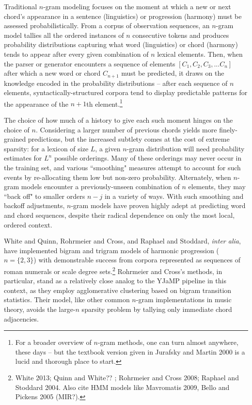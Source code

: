 \begin{enumerate}
Traditional $n$-gram modeling focuses on the moment at which a new or next chord's appearance in a sentence (linguistics) or progression (harmony) must be assessed probabilistically.  From a corpus of observation sequences, an $n$-gram model tallies all the ordered instances of $n$ consecutive tokens and produces probability distributions capturing what word (linguistics) or chord (harmony) tends to appear after every given combination of $n$ lexical elements.  Then, when the parser or generator encounters a sequence of elements $[C_1,C_2,C_3,...C_n]$ after which a new word or chord $C_{n+1}$ must be predicted, it draws on the knowledge encoded in the probability distributions -- after each sequence of $n$ elements, syntactically-structured corpora tend to display predictable patterns for the appearance of the $n+1$th element.\footnote{For a broader overview of $n$-gram methods, one can turn almost anywhere, these days -- but the textbook version given in Jurafsky and Martin 2000 is a lucid and thorough place to start.}

The choice of how much of a history to give each such moment hinges on the choice of $n$.  Considering a larger number of previous chords yields more finely-grained predictions, but the increased subtlety comes at the cost of extreme sparsity: for a lexicon of size $L$, a given $n$-gram distribution will need probability estimates for $L^n$ possible orderings.  Many of these orderings may never occur in the training set, and various ``smoothing" measures attempt to account for such events by re-allocating them low but non-zero probability.  Alternately, when $n$-gram models encounter a previously-unseen combination of $n$ elements, they may ``back off" to smaller orders $n-j$ in a variety of ways.  With such smoothing and backoff adjustments, $n$-gram models have proven highly adept at predicting word and chord sequences, despite their radical dependence on only the most local, ordered context.

White and Quinn, Rohrmeier and Cross, and Raphael and Stoddard, \emph{inter alia}, have implemented bigram and trigram models of harmonic progression ($n=\{2,3\}$) with demonstrable success from corpora represented as sequences of roman numerals or scale degree sets.\footnote{White 2013; Quinn and White?? ; Rohrmeier and Cross 2008; Raphael and Stoddard 2004.  Also cite HMM models like Mavromatis 2009, Bello and Pickens 2005 (MIR?).}  Rohrmeier and Cross's methods, in particular, stand as a relatively close analog to the YJaMP pipeline in this context, as they employ agglomerative clustering based on bigram transition statistics.  Their model, like other common $n$-gram implementations in music theory, avoids the large-$n$ sparsity problem by tallying only immediate chord adjacencies.


\end{enumerate}
